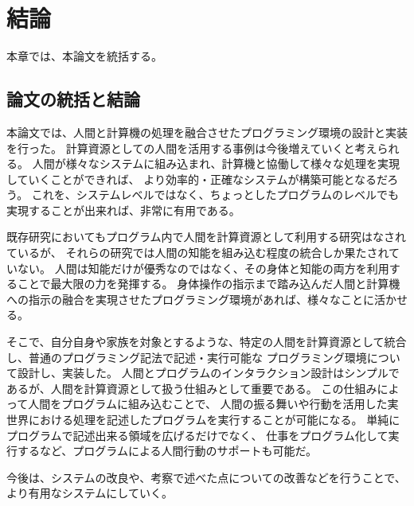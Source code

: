 \chapter{結論}\label{chap:conclusion}

本章では、本論文を統括する。

\newpage

\section{論文の統括と結論}\label{ux8ad6ux6587ux306eux7d71ux62ecux3068ux7d50ux8ad6}

本論文では、人間と計算機の処理を融合させたプログラミング環境の設計と実装を行った。
計算資源としての人間を活用する事例は今後増えていくと考えられる。
人間が様々なシステムに組み込まれ、計算機と協働して様々な処理を実現していくことができれば、
より効率的・正確なシステムが構築可能となるだろう。
これを、システムレベルではなく、ちょっとしたプログラムのレベルでも実現することが出来れば、非常に有用である。

既存研究においてもプログラム内で人間を計算資源として利用する研究はなされているが、
それらの研究では人間の知能を組み込む程度の統合しか果たされていない。
人間は知能だけが優秀なのではなく、その身体と知能の両方を利用することで最大限の力を発揮する。
身体操作の指示まで踏み込んだ人間と計算機への指示の融合を実現させたプログラミング環境があれば、様々なことに活かせる。

そこで、自分自身や家族を対象とするような、特定の人間を計算資源として統合し、普通のプログラミング記法で記述・実行可能な
プログラミング環境について設計し、実装した。
人間とプログラムのインタラクション設計はシンプルであるが、人間を計算資源として扱う仕組みとして重要である。
この仕組みによって人間をプログラムに組み込むことで、
人間の振る舞いや行動を活用した実世界における処理を記述したプログラムを実行することが可能になる。
単純にプログラムで記述出来る領域を広げるだけでなく、
仕事をプログラム化して実行するなど、プログラムによる人間行動のサポートも可能だ。

今後は、システムの改良や、考察で述べた点についての改善などを行うことで、
より有用なシステムにしていく。
